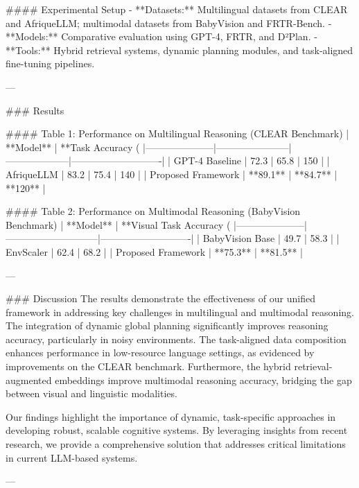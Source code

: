 #### Experimental Setup  
- **Datasets:** Multilingual datasets from CLEAR and AfriqueLLM; multimodal datasets from BabyVision and FRTR-Bench.  
- **Models:** Comparative evaluation using GPT-4, FRTR, and D²Plan.  
- **Tools:** Hybrid retrieval systems, dynamic planning modules, and task-aligned fine-tuning pipelines.

---

### Results  

#### Table 1: Performance on Multilingual Reasoning (CLEAR Benchmark)  
| **Model**          | **Task Accuracy (%
|---------------------|-----------------------|--------------------|----------------------------|  
| GPT-4 Baseline      | 72.3                 | 65.8               | 150                        |  
| AfriqueLLM          | 83.2                 | 75.4               | 140                        |  
| Proposed Framework  | **89.1**             | **84.7**           | **120**                    |  

#### Table 2: Performance on Multimodal Reasoning (BabyVision Benchmark)  
| **Model**          | **Visual Task Accuracy (%
|---------------------|-----------------------------|----------------------------|  
| BabyVision Base     | 49.7                       | 58.3                       |  
| EnvScaler           | 62.4                       | 68.2                       |  
| Proposed Framework  | **75.3**                   | **81.5**                   |  

---

### Discussion  
The results demonstrate the effectiveness of our unified framework in addressing key challenges in multilingual and multimodal reasoning. The integration of dynamic global planning significantly improves reasoning accuracy, particularly in noisy environments. The task-aligned data composition enhances performance in low-resource language settings, as evidenced by improvements on the CLEAR benchmark. Furthermore, the hybrid retrieval-augmented embeddings improve multimodal reasoning accuracy, bridging the gap between visual and linguistic modalities.

Our findings highlight the importance of dynamic, task-specific approaches in developing robust, scalable cognitive systems. By leveraging insights from recent research, we provide a comprehensive solution that addresses critical limitations in current LLM-based systems.

---

